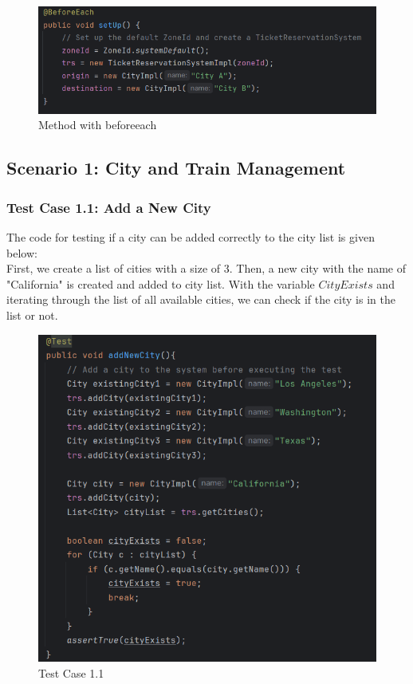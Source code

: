 \documentclass{article}
\begin{document}
 \bigskip
 
\begin{figure}[h]
  \centering
  \includegraphics[width=1.0\textwidth]{pictures/T-B.png}
  \caption{Method with beforeeach}
  \label{fig:your_label}
\end{figure}

\pagebreak
 
\subsection{Scenario 1: City and Train Management}
\subsubsection{Test Case 1.1: Add a New City}
The code for testing if a city can be added correctly to the city list is given below:\\
First, we create a list of cities with a size of 3. Then, a new city with the name of "California" is created and added to city list. With the variable $CityExists$ and iterating through the list of all available cities, we can check if the city is in the list or not.
\begin{figure}[h]
  \centering
  \includegraphics[width=1.0\textwidth]{pictures/T1-1.png}
  \caption{Test Case 1.1}
  \label{fig:your_label}
\end{figure}
\end{document}
